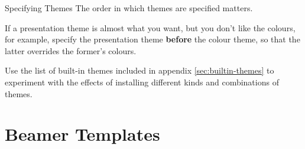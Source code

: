 \begin{frame}{Specifying Themes}
  The \alert<1>{order} in which themes are specified matters.

  If a presentation theme is almost what you want, but you don't like the colours, for example, specify the presentation theme \textbf{before} the colour theme, so that the latter overrides the former's colours.
  \bigskip

  \centering

\end{frame}

\begin{exercise}
  Use the list of built-in themes included in appendix \ref{sec:builtin-themes} to experiment with the effects of installing different kinds and combinations of themes.
\end{exercise}

\section{Beamer Templates}\label{sec:templates}


